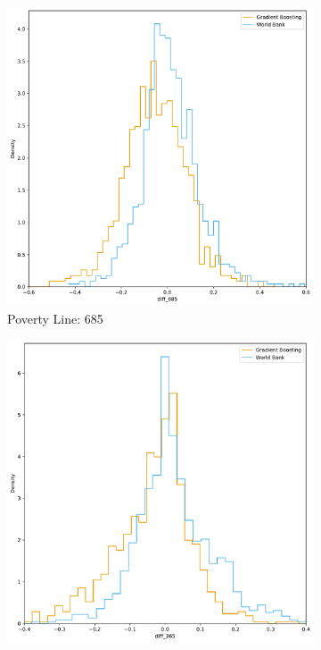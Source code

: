 \begin{figure}[H]
    \caption{Distribution: Difference distribution between predicted and true poverty rate by Province}
    \centering
         \centering
         \begin{subfigure}[b]{0.47\textwidth}
             \centering
             \includegraphics[width=\textwidth]{../figures/fig5a_prediction_vs_wb_diff_distribution_685.pdf}
             \caption{Poverty Line: 685}
         \end{subfigure}
         \hfill
         \begin{subfigure}[b]{0.47\textwidth}
             \centering
             \includegraphics[width=\textwidth]{../figures/fig5b_prediction_vs_wb_diff_distribution_365.pdf}

\end{subfigure}
\end{figure}
